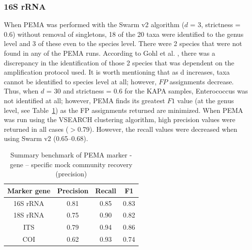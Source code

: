    \subsubsection*{16S rRNA}

      When PEMA was performed with the Swarm v2 algorithm ($d$ = 3, strictness = 0.6) without removal of singletons, 18 of the 20 taxa were identified to the genus level and 3 of these even to the species level. 
      There were 2 species that were not found in any of the PEMA runs. 
      According to Gohl et al. \citep{gohl2016systematic}, there was a discrepancy in the identification of those 2 species that was dependent on the amplification protocol used. 
      It is worth mentioning that as d increases, taxa cannot be identified to species level at all; 
      however, $FP$ assignments decrease. 
      Thus, when $d$ = 30 and strictness = 0.6 for the KAPA samples, Enterococcus was not identified at all; 
      however, PEMA finds its greatest $F1$ value (at the genus level, see Table~\ref{table:pema-precision}) as the FP assignments returned are minimized. 
      When PEMA was run using the VSEARCH clustering algorithm, high precision values were returned in all cases ($>$0.79). 
      However, the recall values were decreased when using Swarm v2 (0.65–0.68).

      \begin{table}
         \begin{center}
            \begin{tabular}{@{}cccc@{}}
               \toprule
               \multicolumn{1}{c}{\textbf{Marker gene}} & \multicolumn{1}{c}{\textbf{Precision}} & \multicolumn{1}{c}{\textbf{Recall}} & \multicolumn{1}{c}{\textbf{F1}} \\ \midrule
               16S rRNA & 0.81 & 0.85 & 0.83 \\
               18S rRNA & 0.75 & 0.90 & 0.82 \\
               ITS & 0.79 & 0.94 & 0.86 \\
               COI & 0.62 & 0.93 & 0.74
               \end{tabular}
               \caption[Summary benchmark of PEMA marker - gene - specific mock community recovery]{Summary benchmark of PEMA marker - gene – specific mock community recovery (precision)}
               \label{table:pema-precision}
         \end{center}
      \end{table}




